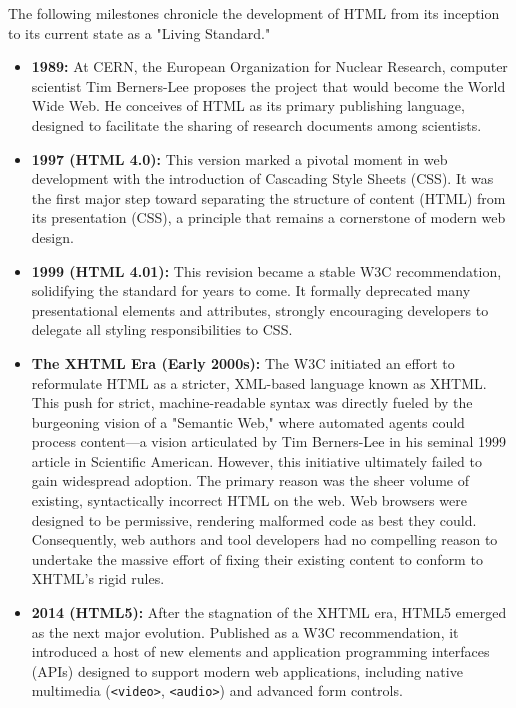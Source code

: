 \documentclass{scrbook}
\begin{document}
The following milestones chronicle the development of HTML from its inception to its current state as a "Living Standard."

\begin{itemize}
    \item
    \textbf{1989:} At CERN, the European Organization for Nuclear Research, computer scientist Tim Berners-Lee proposes the project that would become the World Wide Web. He conceives of HTML as its primary publishing language, designed to facilitate the sharing of research documents among scientists.

    \item 
    \textbf{1997 (HTML 4.0):} This version marked a pivotal moment in web development with the introduction of Cascading Style Sheets (CSS). It was the first major step toward separating the structure of content (HTML) from its presentation (CSS), a principle that remains a cornerstone of modern web design.

    \item 
    \textbf{1999 (HTML 4.01):} This revision became a stable W3C recommendation, solidifying the standard for years to come. It formally deprecated many presentational elements and attributes, strongly encouraging developers to delegate all styling responsibilities to CSS.

    \item 
    \textbf{The XHTML Era (Early 2000s):} The W3C initiated an effort to reformulate HTML as a stricter, XML-based language known as XHTML. This push for strict, machine-readable syntax was directly fueled by the burgeoning vision of a "Semantic Web," where automated agents could process content—a vision articulated by Tim Berners-Lee in his seminal 1999 article in Scientific American. However, this initiative ultimately failed to gain widespread adoption. The primary reason was the sheer volume of existing, syntactically incorrect HTML on the web. Web browsers were designed to be permissive, rendering malformed code as best they could. Consequently, web authors and tool developers had no compelling reason to undertake the massive effort of fixing their existing content to conform to XHTML's rigid rules.

    \item 
    \textbf{2014 (HTML5):} After the stagnation of the XHTML era, HTML5 emerged as the next major evolution. Published as a W3C recommendation, it introduced a host of new elements and application programming interfaces (APIs) designed to support modern web applications, including native multimedia (\texttt{<video>}, \texttt{<audio>}) and advanced form controls.


\end{itemize}
\end{document}
